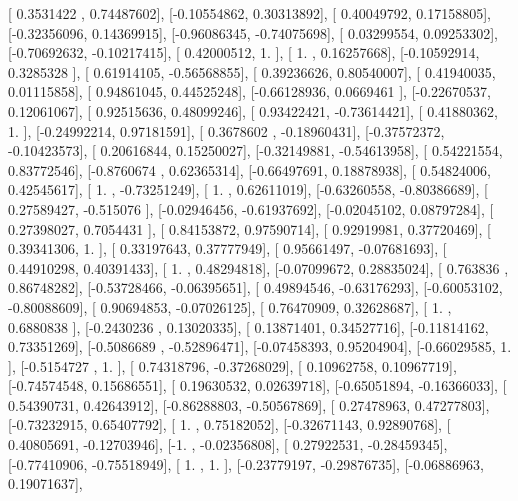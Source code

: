 \documentclass{article}
\begin{document}
       [ 0.3531422 ,  0.74487602],
       [-0.10554862,  0.30313892],
       [ 0.40049792,  0.17158805],
       [-0.32356096,  0.14369915],
       [-0.96086345, -0.74075698],
       [ 0.03299554,  0.09253302],
       [-0.70692632, -0.10217415],
       [ 0.42000512,  1.        ],
       [ 1.        ,  0.16257668],
       [-0.10592914,  0.3285328 ],
       [ 0.61914105, -0.56568855],
       [ 0.39236626,  0.80540007],
       [ 0.41940035,  0.01115858],
       [ 0.94861045,  0.44525248],
       [-0.66128936,  0.0669461 ],
       [-0.22670537,  0.12061067],
       [ 0.92515636,  0.48099246],
       [ 0.93422421, -0.73614421],
       [ 0.41880362,  1.        ],
       [-0.24992214,  0.97181591],
       [ 0.3678602 , -0.18960431],
       [-0.37572372, -0.10423573],
       [ 0.20616844,  0.15250027],
       [-0.32149881, -0.54613958],
       [ 0.54221554,  0.83772546],
       [-0.8760674 ,  0.62365314],
       [-0.66497691,  0.18878938],
       [ 0.54824006,  0.42545617],
       [ 1.        , -0.73251249],
       [ 1.        ,  0.62611019],
       [-0.63260558, -0.80386689],
       [ 0.27589427, -0.515076  ],
       [-0.02946456, -0.61937692],
       [-0.02045102,  0.08797284],
       [ 0.27398027,  0.7054431 ],
       [ 0.84153872,  0.97590714],
       [ 0.92919981,  0.37720469],
       [ 0.39341306,  1.        ],
       [ 0.33197643,  0.37777949],
       [ 0.95661497, -0.07681693],
       [ 0.44910298,  0.40391433],
       [ 1.        ,  0.48294818],
       [-0.07099672,  0.28835024],
       [ 0.763836  ,  0.86748282],
       [-0.53728466, -0.06395651],
       [ 0.49894546, -0.63176293],
       [-0.60053102, -0.80088609],
       [ 0.90694853, -0.07026125],
       [ 0.76470909,  0.32628687],
       [ 1.        ,  0.6880838 ],
       [-0.2430236 ,  0.13020335],
       [ 0.13871401,  0.34527716],
       [-0.11814162,  0.73351269],
       [-0.5086689 , -0.52896471],
       [-0.07458393,  0.95204904],
       [-0.66029585,  1.        ],
       [-0.5154727 ,  1.        ],
       [ 0.74318796, -0.37268029],
       [ 0.10962758,  0.10967719],
       [-0.74574548,  0.15686551],
       [ 0.19630532,  0.02639718],
       [-0.65051894, -0.16366033],
       [ 0.54390731,  0.42643912],
       [-0.86288803, -0.50567869],
       [ 0.27478963,  0.47277803],
       [-0.73232915,  0.65407792],
       [ 1.        ,  0.75182052],
       [-0.32671143,  0.92890768],
       [ 0.40805691, -0.12703946],
       [-1.        , -0.02356808],
       [ 0.27922531, -0.28459345],
       [-0.77410906, -0.75518949],
       [ 1.        ,  1.        ],
       [-0.23779197, -0.29876735],
       [-0.06886963,  0.19071637],
\end{document}
